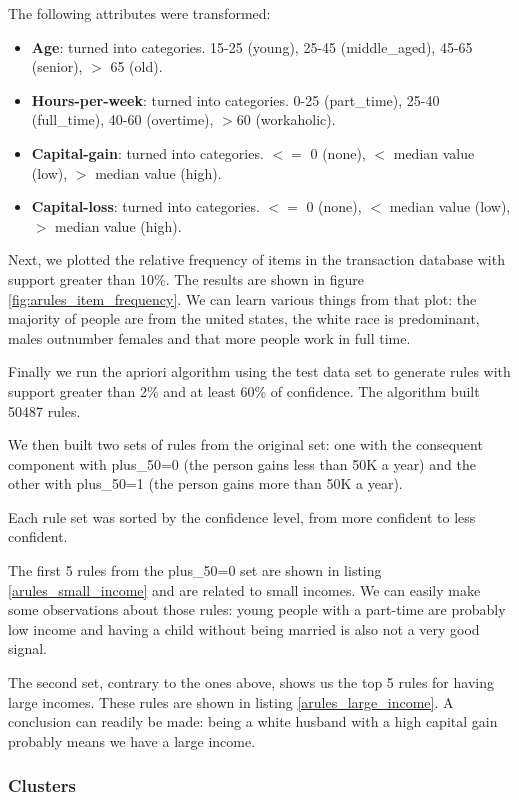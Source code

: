 \documentclass[a4paper]{llncs}
\begin{document}
The following attributes were transformed:

\begin{itemize}
  \item {\textbf{Age}: turned into categories. 15-25 (young), 25-45 (middle\_aged), 45-65 (senior), $>$ 65 (old).}
  \item {\textbf{Hours-per-week}: turned into categories. 0-25 (part\_time), 25-40 (full\_time), 40-60 (overtime), $>$60 (workaholic).}
  \item {\textbf{Capital-gain}: turned into categories. $<=$ 0 (none), $<$ median value (low), $>$ median value (high).}
  \item {\textbf{Capital-loss}: turned into categories. $<=$ 0 (none), $<$ median value (low), $>$ median value (high).}
\end{itemize}

Next, we plotted the relative frequency of items in the transaction database
with support greater than 10\%. The results are shown in figure \ref{fig:arules_item_frequency}.
We can learn various things from that plot: the majority of people are from the united states,
the white race is predominant, males outnumber females and that more people work in full time.

Finally we run the apriori algorithm using the test data set to generate rules
with support greater than 2\% and at least 60\% of confidence. The algorithm built
50487 rules.

We then built two sets of rules from the original set: one with the consequent component
with plus\_50=0 (the person gains less than 50K a year) and the other with plus\_50=1
(the person gains more than 50K a year).

Each rule set was sorted by the confidence level, from more confident to less confident.

The first 5 rules from the plus\_50=0 set are shown in listing \ref{arules_small_income} and
are related to small incomes. We can easily make some observations
about those rules: young people with a part-time are probably low income and having a child
without being married is also not a very good signal.

The second set, contrary to the ones above, shows us the top 5 rules for having large incomes.
These rules are shown in listing \ref{arules_large_income}. A conclusion can readily be made:
being a white husband with a high capital gain probably means we have a large income.

\subsubsection{Clusters}
\end{document}
